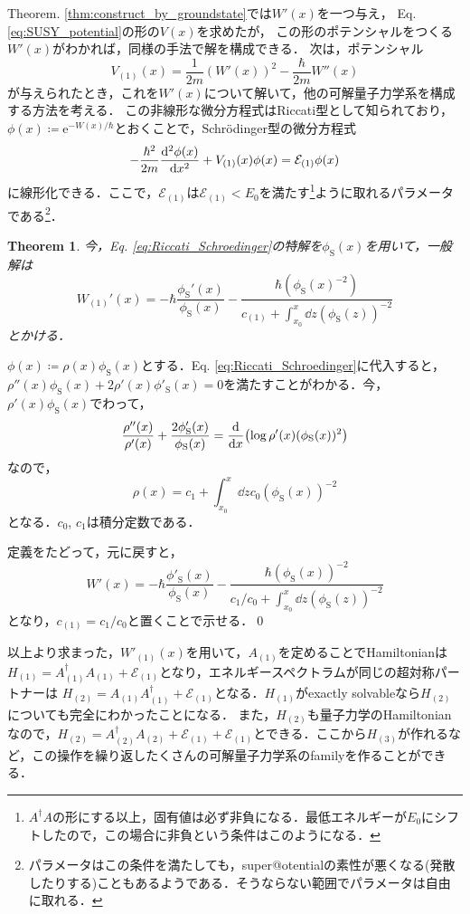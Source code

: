 \documentclass[english, dvipdfmx, a4paper]{jsarticle}
\theoremstyle{break}
\newtheorem{thm}{Theorem}
\newcommand{\e}{\mathrm{e}}
\renewcommand{\S}{\text{S}}
\begin{document}
	Theorem. \ref{thm:construct_by_groundstate}では$W'(x)$を一つ与え，
	Eq. \eqref{eq:SUSY_potential}の形の$V(x)$を求めたが，
	この形のポテンシャルをつくる$W'(x)$がわかれば，同様の手法で解を構成できる．
	次は，ポテンシャル
	\begin{equation}
		V_{(1)}(x) = \frac{1}{2m}(W'(x))^2 -\frac{\hbar}{2m}W''(x)
	\end{equation}
	が与えられたとき，これを$W'(x)$について解いて，他の可解量子力学系を構成する方法を考える．
	この非線形な微分方程式はRiccati型として知られており，
	$\phi(x) \coloneqq \e^{-W(x)/\hbar}$とおくことで，Schr\"{o}dinger型の微分方程式
	\begin{equation}
		-\frac{\hbar^2}{2m}\dv[2]{\phi(x)}{x} + V_{(1)}(x)\phi(x) = \mathcal{E}_{(1)}\phi(x)\label{eq:Riccati_Schroedinger}
	\end{equation}
	に線形化できる．ここで，$\mathcal{E}_{(1)}$は$\mathcal{E}_{(1)} < E_0$を満たす\footnote{$A^{\dag}A$の形にする以上，固有値は必ず非負になる．最低エネルギーが$E_0$にシフトしたので，この場合に非負という条件はこのようになる．}ように取れるパラメータである\footnote{パラメータはこの条件を満たしても，super@otentialの素性が悪くなる(発散したりする)こともあるようである．そうならない範囲でパラメータは自由に取れる．}．
	\begin{thm}
		今，Eq. \eqref{eq:Riccati_Schroedinger}の特解を$\phi_{\S}(x)$を用いて，一般解は
		\begin{equation}
			W_{(1)}'(x) = -\hbar \frac{\phi_{\S}'(x)}{\phi_\S(x)} - \frac{\hbar(\phi_\S(x)^{-2})}{c_{(1)} + \displaystyle\int_{x_0}^{x}\dd{z}(\phi_{\S}(z))^{-2}}
		\end{equation}
		とかける．
	\end{thm}
	$\phi(x)\coloneqq \rho(x)\phi_\S(x)$とする．Eq. \eqref{eq:Riccati_Schroedinger}に代入すると，
	$\rho''(x)\phi_\S(x) + 2\rho'(x)\phi'_\S(x) = 0$を満たすことがわかる．今，$\rho'(x)\phi_\S(x)$でわって，
	\begin{equation}
		\frac{\rho''(x)}{\rho'(x)} + \frac{2\phi_\S'(x)}{\phi_\S(x)} = \dv{}{x} \qty(\log \rho'(x)(\phi_\S(x))^2)
	\end{equation}
	なので，
	\begin{equation}
		\rho(x) = c_1 + \int_{x_0}^{x}\dd{z}c_0(\phi_\S(x))^{-2}
	\end{equation}
	となる．$c_0$, $c_1$は積分定数である．

	定義をたどって，元に戻すと，
	\begin{equation}
		W'(x) = - \hbar\frac{\phi'_\S(x)}{\phi_\S(x)} - \frac{\hbar(\phi_\S(x))^{-2}}{c_1/c_0 + \int_{x_0}^{x}\dd{z}(\phi_\S(z))^{-2}}
	\end{equation}
	となり，$c_{(1)} = c_1/c_0$と置くことで示せる．\qed


	以上より求まった，$W'_{(1)}(x)$を用いて，$A_{(1)}$を定めることでHamiltonianは$H_{(1)} = A_{(1)}^\dag A_{(1)} + \mathcal{E}_{(1)}$となり，エネルギースペクトラムが同じの超対称パートナーは
	$H_{(2)} = A_{(1)}A_{(1)}^{\dag} + \mathcal{E}_{(1)}$となる．$H_{(1)}$がexactly solvableなら$H_{(2)}$についても完全にわかったことになる．
	また，$H_{(2)}$も量子力学のHamiltonianなので，$H_{(2)} = A_{(2)}^{\dag}A_{(2)} + \mathcal{E}_{(1)} + \mathcal{E}_{(1)}$とできる．ここから$H_{(3)}$が作れるなど，この操作を繰り返したくさんの可解量子力学系のfamilyを作ることができる．
\end{document}
